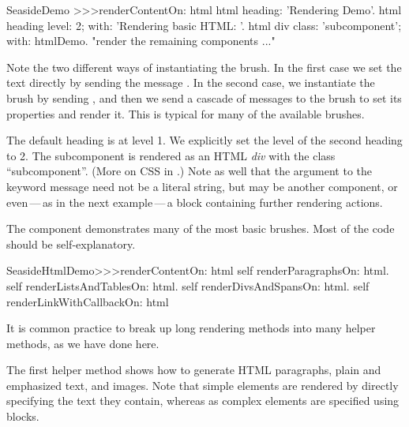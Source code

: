 \documentclass[a4paper,10pt,twoside]{book}
\begin{document}
\begin{code}{}
SeasideDemo >>>renderContentOn: html
	html heading: 'Rendering Demo'.
	html heading
		level: 2;
		with: 'Rendering basic HTML: '.
	html div
		class: 'subcomponent';
		with: htmlDemo.
	"render the remaining components ..."
\end{code}

Note the two different ways of instantiating the  brush.
In the first case we set the text directly by sending the message .
In the second case, we instantiate the brush by sending , and then we send a cascade of messages to the brush to set its properties and render it.
This is typical for many of the available brushes.


The default heading is at level 1.
We explicitly set the level of the second heading to 2.
The subcomponent is rendered as an HTML \emph{div} with the  class ``subcomponent''.
(More on CSS in .)
Note as well that the argument to the  keyword message need not be a literal string, but may be another component, or even\,---\,as in the next example\,---\,a block containing further rendering actions.

The  component demonstrates many of the most basic brushes.
Most of the code should be self-explanatory.

\begin{code}{}
SeasideHtmlDemo>>>renderContentOn: html 
	self renderParagraphsOn: html.
	self renderListsAndTablesOn: html.
	self renderDivsAndSpansOn: html.
	self renderLinkWithCallbackOn: html
\end{code}

It is common practice to break up long rendering methods into many helper methods, as we have done here.


The first helper method shows how to generate HTML paragraphs, plain and emphasized text, and images.
Note that simple elements are rendered by directly specifying the text they contain, whereas as complex elements are specified using blocks.
\end{document}
